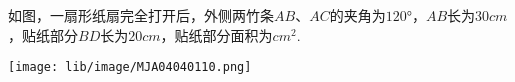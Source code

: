 如图，一扇形纸扇完全打开后，外侧两竹条$AB$、$AC$的夹角为$120°$，$AB$长为$30cm$，贴纸部分$BD$长为$20cm$，贴纸部分面积为\key{}$cm^2$.
\begin{center}
    \texttt{[image: lib/image/MJA04040110.png]}
\end{center}